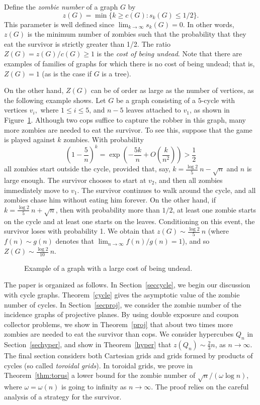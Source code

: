 \documentclass[12pt]{amsart}
\begin{document}
Define the \emph{zombie number} of a graph $G$ by
$$
z(G) = \min \{ k \ge c(G) : s_k(G) \le 1/2 \} .
$$
This parameter is well defined since $\lim_{k\to\infty}s_k(G)=0$. In other words, $z(G)$ is the minimum number of zombies such that the probability that they eat the survivor is strictly greater than 1/2. The ratio $Z(G) = z(G)/c(G) \ge 1$ is the \emph{cost of being undead}.  Note that there are examples of families of graphs for which there is no cost of being undead; that is, $Z(G)=1$ (as is the case if $G$ is a tree).

On the other hand, $Z(G)$ can be of order as large as the number of vertices, as the following example shows. Let $G$ be a graph consisting of a $5$-cycle with vertices $v_i,$ where $1\le i \le 5$,
and $n-5$ leaves attached to $v_1$, as shown in Figure~\ref{fig:large}. Although two cops suffice to capture the robber in this graph, many more zombies are needed to eat the survivor. To see this, suppose
that the game is played against $k$ zombies. With probability
$$
\left( 1- \frac{5}{n} \right)^{k} = \exp \left( - \frac {5k}{n} + O \left( \frac {k}{n^2} \right) \right) > \frac 12
$$
all zombies start outside the cycle, provided that, say, $k = \frac {\log 2}{5} \ n - \sqrt{n}$ and $n$ is large enough. The survivor chooses to start at $v_2$, and then all zombies immediately move to $v_1$. The survivor
continues to walk around the cycle, and all zombies chase him without eating him forever. On the other hand, if $k = \frac {\log 2}{5} \ n + \sqrt{n}$, then with probability more than $1/2$, at least one
zombie starts on the cycle and at least one starts on the leaves. Conditioning on this event, the survivor loses with probability 1. We obtain that $z(G) \sim \frac {\log 2}{5} \ n$ (where $f(n) \sim g(n)$ denotes that $\lim_{n \to \infty} f(n)/g(n) = 1$), and so $Z(G) \sim
\frac {\log 2}{10} \ n$.
\begin{figure} [h!]
\begin{center}
\caption{Example of a graph with a large cost of being undead. }\label{fig:large}
\end{center}
\end{figure}

\bigskip

The paper is organized as follows. In Section~\ref{seccycle}, we begin our discussion with cycle graphs.  Theorem~\ref{cycle} gives the asymptotic value of the zombie number of cycles. In
Section~\ref{secproj}, we consider the zombie number of the incidence graphs of projective planes. By using double exposure and coupon collector problems, we show in Theorem~\ref{proj} that about two
times more zombies are needed to eat the survivor than cops. We consider hypercubes $Q_n$ in Section~\ref{sechyper}, and show in Theorem~\ref{hyper} that $z(Q_n) \sim \frac23
n$, as $n \to \infty$. The final section considers both Cartesian grids and grids formed by products of cycles (so called \emph{toroidal grids}). In toroidal grids, we prove in
Theorem~\ref{thm:torus} a lower bound for the zombie number of $\sqrt n/(\omega\log n)$, where $\omega = \omega(n)$ is going to infinity as $n \to \infty$. The proof relies on the careful analysis of a
strategy for the survivor.
\end{document}
